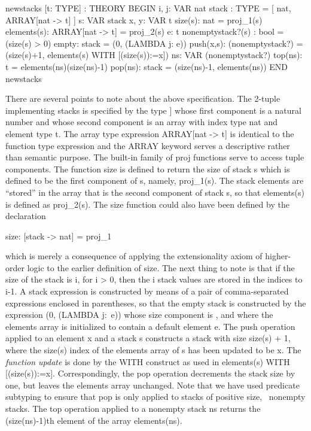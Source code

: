 \begin{pvsexample}
  newstacks [t: TYPE] : THEORY 
   BEGIN
    i, j: VAR nat
    stack : TYPE = [ nat, ARRAY[nat -> t] ]
    s: VAR stack
    x, y: VAR t
    size(s): nat = proj\_1(s)
    elements(s): ARRAY[nat -> t] = proj\_2(s)
    e: t
    nonemptystack?(s) : bool = (size(s) > 0)
    empty: stack = (0, (LAMBDA j: e))
    push(x,s): (nonemptystack?) =
      (size(s)+1, elements(s) WITH [(size(s)):=x])
    ns: VAR (nonemptystack?)
    top(ns): t = elements(ns)(size(ns)-1)
    pop(ns): stack = (size(ns)-1, elements(ns))
   END newstacks 
\end{pvsexample}
%
There are several points to note about the above specification.  The
2-tuple implementing stacks is specified by the type {\stt [nat, ARRAY
[nat -> t]]} whose first component is a natural number and whose
second component is an array with index type {\stt nat} and element
type {\stt t}.  The array type expression {\stt ARRAY[nat -> t]} is
identical to the function type expression {\stt [nat -> t]} and the
{\stt ARRAY} keyword serves a descriptive rather than semantic
purpose.  The built-in family of {\stt proj} functions serve to access
tuple components.  The function {\stt size} is defined to return the
size of stack {\stt s} which is defined to be the first component of
{\stt s}, namely, {\stt proj\_1(s)}.  The stack elements are
``stored'' in the array that is the second component of stack {\stt
s}, so that {\stt elements(s)} is defined as {\stt proj\_2(s)}.  The
{\stt size} function could also have been defined by the declaration
\begin{pvsexample}
size: [stack -> nat] = proj_1
\end{pvsexample}
%
which is merely a consequence of applying the extensionality axiom of
higher-order logic to the earlier definition of {\stt size}.  The next
thing to note is that if the size of the stack is {\stt i}, for {\stt i >
0}, then the {\stt i} stack values are stored in the indices {} to
{\stt i-1}.  A stack expression is constructed by means of a pair of
comma-separated expressions enclosed in parentheses, so that the empty
stack is constructed by the expression {\stt (0, (LAMBDA j:\ e))} whose
size component is {}, and where the {\stt elements} array is
initialized to contain a default element {\stt e}.  The {\stt push}
operation applied to an element {\stt x} and a stack {\stt s} constructs a
stack with size {\stt size(s) + 1}, where the {\stt size(s)} index of the
{\stt elements} array of {\stt s} has been updated to be {\stt x}.  The
{\em function update\/} is done by the {\stt WITH} construct as used in
{\stt elements(s) WITH [(size(s)):=x]}.  Correspondingly, the {\stt pop}
operation decrements the stack size by one, but leaves the {\stt
elements} array unchanged.  Note that we have used predicate subtyping
to ensure that {\stt pop} is only applied to stacks of positive size,
\ie\ nonempty stacks.  The {\stt top} operation applied to a nonempty
stack {\stt ns} returns the {\stt (size(ns)-1)}th element of the array
{\stt elements(ns)}.

